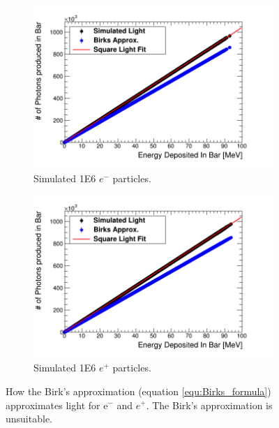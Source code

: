 \begin{figure}[htbp]
\centering
\begin{subfigure}{.5\textwidth}
  \centering
  \includegraphics[width=\linewidth]{Appendix5/newFigs/e-BirksSlab_simAndApproxLight.png}
  \captionsetup{width=.9\linewidth}
  \caption{Simulated 1E6 $e^-$ particles.}
  \label{subfig:append5_light_of_electrons0-100mev}
\end{subfigure}%
\begin{subfigure}{.5\textwidth}
  \centering
  \includegraphics[width=\linewidth]{Appendix5/newFigs/e+BirksSlab_simAndApproxLight.png}
  \captionsetup{width=.9\linewidth}
  \caption{Simulated 1E6 $e^+$ particles.}
  \label{subfig:append5_light_of_positrons0-100mev}
\end{subfigure}
\caption{How the Birk's approximation (equation \ref{equ:Birks_formula}) approximates light for e$^-$ and $e^+$. The Birk's approximation is unsuitable.}
\label{fig:append5_light_of_electrons_positrons0-100mev}
\end{figure}

